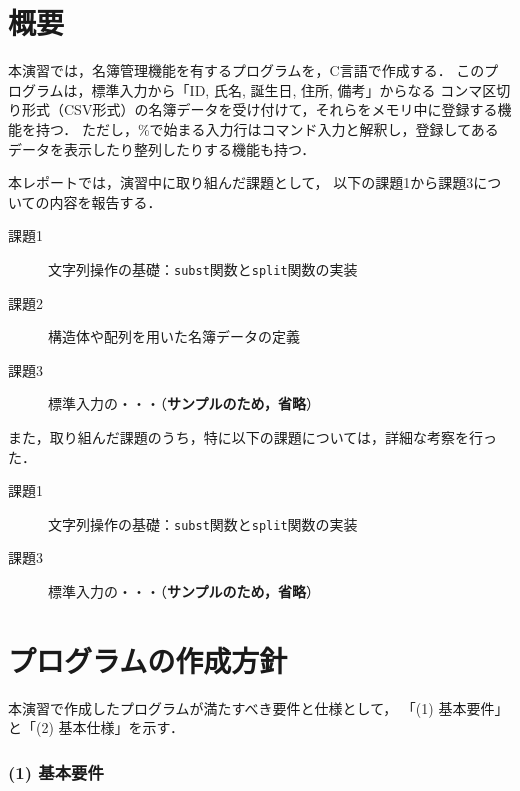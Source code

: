 \section{概要} \label{sec:abstract}

本演習では，名簿管理機能を有するプログラムを，C言語で作成する．
このプログラムは，標準入力から「ID, 氏名, 誕生日, 住所, 備考」からなる
コンマ区切り形式（CSV形式）の名簿データを受け付けて，それらをメモリ中に登録する機能を持つ．
ただし，\%で始まる入力行はコマンド入力と解釈し，登録してあるデータを表示したり整列したりする機能も持つ．

本レポートでは，演習中に取り組んだ課題として，
以下の課題1から課題3についての内容を報告する．
%
\begin{description}
  \item[課題1] 文字列操作の基礎：\verb|subst|関数と\verb|split|関数の実装
  \item[課題2] 構造体や配列を用いた名簿データの定義
  \item[課題3] 標準入力の・・・（\textbf{サンプルのため，省略}）
\end{description}
%
また，取り組んだ課題のうち，特に以下の課題については，詳細な考察を行った．
%
\begin{description}
  \item[課題1] 文字列操作の基礎：\verb|subst|関数と\verb|split|関数の実装
  \item[課題3] 標準入力の・・・（\textbf{サンプルのため，省略}）
\end{description}


\section{プログラムの作成方針}\label{sec:plan}

本演習で作成したプログラムが満たすべき要件と仕様として，
「(1) 基本要件」と「(2) 基本仕様」を示す．

\subsubsection*{(1) 基本要件}

